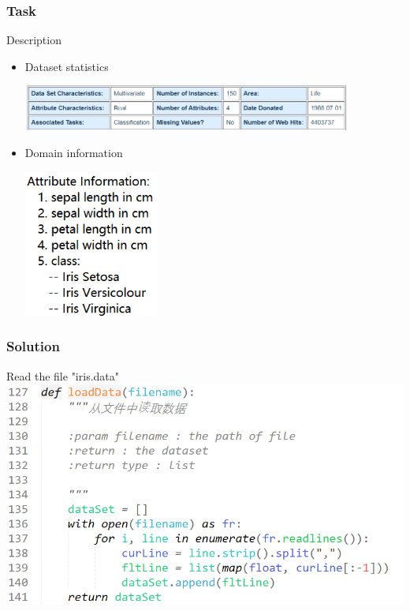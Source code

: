 \documentclass{beamer}
\begin{document}
\begin{frame}
  \frametitle{Task}
  \begin{block}{Description}
	
    \begin{itemize}
      \item Dataset statistics

\includegraphics[width=0.85\textwidth]{Pic/dataset}
      \item Domain information

\includegraphics[width=0.35\textwidth]{Pic/domain}
    \end{itemize}

  \end{block}
\end{frame}


\begin{frame}
  \frametitle{Solution}
      Read the file "iris.data"
      \\[10pt]
      \includegraphics[width=1.0\textwidth]{Pic/loadData.png}


\end{frame}
\end{document}
